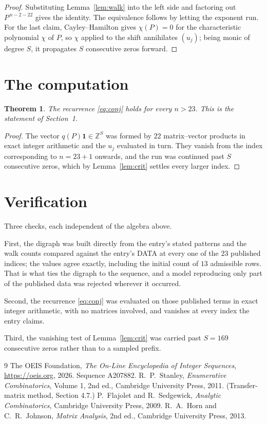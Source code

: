 \documentclass[11pt,a4paper]{article}
\theoremstyle{plain}
\newtheorem{theorem}{Theorem}
\theoremstyle{definition}
\begin{document}
\begin{proof}
Substituting Lemma~\ref{lem:walk} into the left side and factoring out
$P^{\,n-2-22}$ gives the identity. The equivalence follows by letting the exponent
run. For the last claim, Cayley--Hamilton gives $\chi(P)=0$ for the characteristic
polynomial $\chi$ of $P$, so $\chi$ applied to the shift annihilates $(u_j)$; being monic of
degree $S$, it propagates $S$ consecutive zeros forward.
\end{proof}

\section{The computation}

\begin{theorem}
The recurrence \eqref{eq:conj} holds for every $n>23$. This is the statement of
Section~1.
\end{theorem}

\begin{proof}
The vector $q(P)\mathbf{1}\in\mathbb{Z}^{S}$ was formed by $22$ matrix--vector
products in exact integer arithmetic and the $u_j$ evaluated in turn. They vanish from the
index corresponding to $n=23+1$ onwards, and the run was continued past $S$ consecutive
zeros, which by Lemma~\ref{lem:crit} settles every larger index.
\end{proof}

\section{Verification}

Three checks, each independent of the algebra above.

First, the digraph was built directly from the entry's stated patterns and the walk counts
compared against the entry's DATA at every one of the $23$ published indices; the
values agree exactly, including the initial count of $13$ admissible rows. That is
what ties the digraph to the sequence, and a model reproducing only part of the published
data was rejected wherever it occurred.

Second, the recurrence \eqref{eq:conj} was evaluated on those published terms in exact
integer arithmetic, with no matrices involved, and vanishes at every index the entry claims.

Third, the vanishing test of Lemma~\ref{lem:crit} was carried past $S=169$ consecutive
zeros rather than to a sampled prefix.

\begin{thebibliography}{9}
 The OEIS Foundation, \emph{The On-Line Encyclopedia of Integer
Sequences}, \url{https://oeis.org}, 2026. Sequence A207882.
 R.~P.~Stanley, \emph{Enumerative Combinatorics}, Volume 1, 2nd ed.,
Cambridge University Press, 2011. (Transfer-matrix method, Section 4.7.)
 P.~Flajolet and R.~Sedgewick, \emph{Analytic Combinatorics}, Cambridge
University Press, 2009.
 R.~A.~Horn and C.~R.~Johnson, \emph{Matrix Analysis}, 2nd ed., Cambridge
University Press, 2013.
\end{thebibliography}
\end{document}
